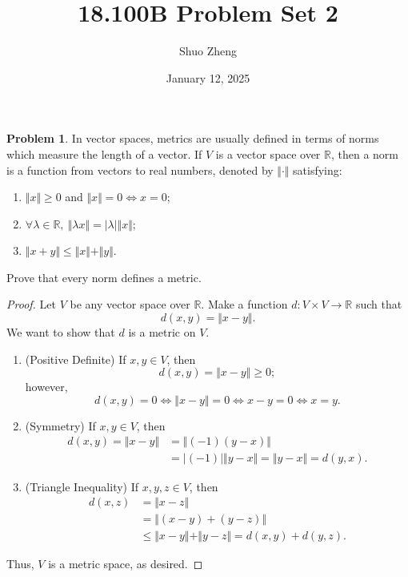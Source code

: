 \documentclass{amsart}
\title{18.100B Problem Set 2}
\author{Shuo Zheng}
\date{January 12, 2025}
\theoremstyle{definition}
\newtheorem{problem}{Problem}
\begin{document}
\maketitle

\begin{problem}
    In vector spaces, metrics are usually defined in terms of norms which measure the length of a vector. If $V$ is a vector space over $\mathbb{R}$, then a norm is a function from vectors to real numbers, denoted by $\Vert \cdot \Vert$ satisfying:
    \begin{enumerate}[label = (\roman*)]
        \item $\Vert x \Vert \geq 0$ and $\Vert x \Vert = 0 \iff x = 0$;
        \item $\forall \lambda \in \mathbb{R}, \ \Vert \lambda x \Vert = \vert \lambda \vert \Vert x \Vert$;
        \item $\Vert x+y \Vert \leq \Vert x \Vert + \Vert y \Vert$.
    \end{enumerate}
    Prove that every norm defines a metric. 
\end{problem}

\begin{proof}
    Let $V$ be any vector space over $\mathbb{R}$. Make a function $d: V \times V \to \mathbb{R}$ such that 
    \[
    d(x,y) = \Vert x-y \Vert.
    \]
    We want to show that $d$ is a metric on $V$.
    \begin{enumerate} [label = (\alph*)]
        \item (Positive Definite) If $x,y \in V$, then
        \[
        d(x,y) = \Vert x-y \Vert \geq 0;
        \]
        however,
        \[
        d(x,y) = 0 \iff \Vert x - y \Vert = 0 \iff x - y = 0 \iff x = y.
        \]
        \item (Symmetry) If $x,y \in V$, then
        \begin{align*}
            d(x,y) = \Vert x-y \Vert &= \Vert (-1)(y-x) \Vert \\
            &= \vert (-1) \vert \Vert y-x \Vert = \Vert y-x \Vert = d(y,x).
        \end{align*}
        \item (Triangle Inequality) If $x,y,z \in V$, then
        \begin{align*}
            d(x,z) &= \Vert x-z \Vert \\
            &= \Vert (x-y) + (y-z) \Vert \\
            &\leq \Vert x-y \Vert + \Vert y-z \Vert = d(x,y) + d(y,z).
        \end{align*}
    \end{enumerate}
    Thus, $V$ is a metric space, as desired.
\end{proof}
\end{document}
